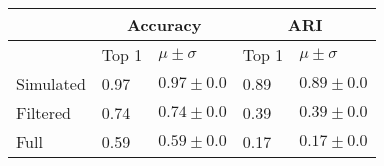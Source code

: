 \begin{tabular}{lllll}
\toprule
{} & \multicolumn{2}{c}{Accuracy} &   \multicolumn{2}{c}{ARI} \\
\midrule
{} & Top 1 & $\mu \pm \sigma$ & Top 1 & $\mu \pm \sigma$ \\
Simulated &  0.97 &  $0.97 \pm 0.0$ &  0.89 & $0.89\pm 0.0$ \\
Filtered  &   0.74 & $0.74\pm 0.0$ &  0.39 &$0.39\pm 0.0$ \\
Full      &   0.59 &  $0.59\pm 0.0$ & 0.17& $0.17\pm 0.0$ \\
\bottomrule
\end{tabular}
